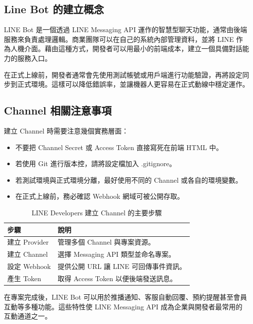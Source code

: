 \subsection{Line Bot 的建立概念}

LINE Bot 是一個透過 LINE Messaging API 運作的智慧型聊天功能，通常由後端服務來負責處理邏輯。商業團隊可以在自己的系統內部管理資料，並將 LINE 作為人機介面。藉由這種方式，開發者可以用最小的前端成本，建立一個具備對話能力的服務入口。

在正式上線前，開發者通常會先使用測試帳號或用戶端進行功能驗證，再將設定同步到正式環境。這樣可以降低錯誤率，並讓機器人更容易在正式動線中穩定運作。

\subsection{Channel 相關注意事項}

建立 Channel 時需要注意幾個實務層面：
\begin{itemize}[leftmargin=2em]
    \item 不要把 Channel Secret 或 Access Token 直接寫死在前端 HTML 中。
    \item 若使用 Git 進行版本控，請將設定檔加入 .gitignore。
    \item 若測試環境與正式環境分離，最好使用不同的 Channel 或各自的環境變數。
    \item 在正式上線前，務必確認 Webhook 網域可被公開存取。
\end{itemize}

\begin{table}[H]
    \centering
    \caption{LINE Developers 建立 Channel 的主要步驟}
    \begin{tabular}{|p{4cm}|p{8cm}|}
        \hline
        \textbf{步驟} & \textbf{說明} \\
        \hline
        建立 Provider & 管理多個 Channel 與專案資源。 \\
        \hline
        建立 Channel & 選擇 Messaging API 類型並命名專案。 \\
        \hline
        設定 Webhook & 提供公開 URL 讓 LINE 可回傳事件資訊。 \\
        \hline
        產生 Token & 取得 Access Token 以便後端發送訊息。 \\
        \hline
    \end{tabular}
\end{table}

在專案完成後，LINE Bot 可以用於推播通知、客服自動回覆、預約提醒甚至會員互動等多種功能。這些特性使 LINE Messaging API 成為企業與開發者最常用的互動通道之一。
